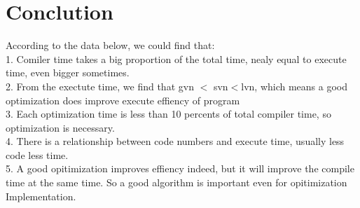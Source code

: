 \section{Conclution}
According to the data below, we could find that:\\
1. Comiler time takes a big proportion of the total time, nealy equal
to execute time, even bigger sometimes.\\
2. From the exectute time, we find that gvn $<$ svn$<$lvn, which means a
good optimization does improve execute effiency of program \\
3. Each optimization time is less than 10 percents of total compiler
time, so optimization is necessary.\\ 
4. There is a relationship between code numbers and execute time,
usually less code less time.\\
5. A good opitimization improves effiency indeed, but it will improve
the compile time at the same time. So a good algorithm is important
even for opitimization Implementation.
  



\begin{flushright}
\end{flushright}
